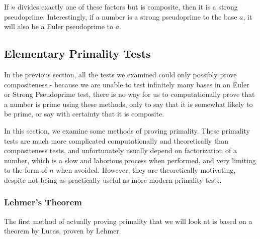 \documentclass{article}
\begin{document}
\par If $n$ divides exactly one of these factors but is composite, then it is a strong pseudoprime. Interestingly, if a number is
a strong pseudoprime to the base $a$, it will also be a Euler pseudoprime to $a$.








\subsection*{Elementary Primality Tests}

\par In the previous section, all the tests we examined could only possibly prove compositeness - because we are unable to test infinitely many bases in an Euler or Strong Pseudoprime test, there is no way for us to computationally prove that a number is prime using these methods, only to say that it is somewhat likely to be prime, or say with certainty that it is composite. 
\par In this section, we examine some methods of proving primality. These primality tests are much more complicated computationally and theoretically than compositeness tests, and unfortunately usually depend on factorization of a number, which is a slow and laborious process when performed, and very limiting to the form of $n$ when avoided. However, they are theoretically motivating, despite not being as practically useful as more modern primality tests.

\subsubsection*{Lehmer's Theorem}

\par The first method of actually proving primality that we will look at is based on a theorem by Lucas, proven by Lehmer.
\end{document}
